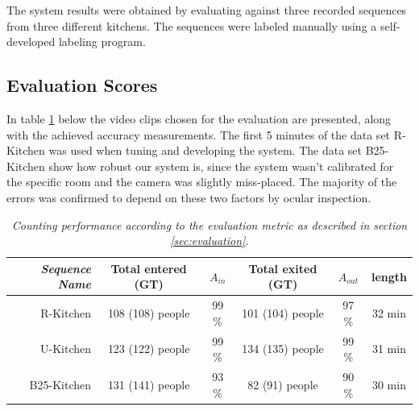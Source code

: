 The system results were obtained by evaluating against three recorded sequences from three different kitchens. The sequences were labeled manually using a self-developed labeling program.

\subsection{Evaluation Scores}
In table \ref{tab:evaluation_performance} below the video clips chosen for the evaluation are presented, along with the achieved accuracy measurements. The first 5 minutes of the data set R-Kitchen was used when tuning and developing the system. The data set B25-Kitchen show how robust our system is, since the system wasn't calibrated for the specific room and the camera was slightly miss-placed. The majority of the errors was confirmed to depend on these two factors by ocular inspection.

\begin{table}[h]
\centering
	\begin{tabular}{r | c | c | c | c | c  }
			\emph{Sequence Name}		&  Total entered (GT) & \emph{$A_{in}$} & Total exited (GT) & \emph{$A_{out}$} & length \\
			\hline \hline
			R-Kitchen			& 108 (108) people & 99 \% & 101 (104) people & 97 \% & 32 min\\
			U-Kitchen			& 123 (122) people & 99 \% & 134 (135) people & 99 \% & 31 min  \\
			B25-Kitchen			& 131 (141) people & 93 \% & 82 (91) people & 90 \% & 30 min \\
			\end{tabular}
	\caption[System performance]{\textit{Counting performance according to the evaluation metric as described in section \ref{sec:evaluation}.}}
	\label{tab:evaluation_performance}
\end{table}

